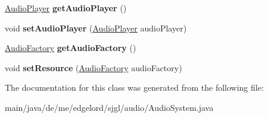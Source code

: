 \begin{DoxyCompactItemize}
\mbox{\hyperlink{classde_1_1me_1_1edgelord_1_1sjgl_1_1audio_1_1_audio_player}{Audio\+Player}} {\bfseries get\+Audio\+Player} ()
\item 
\mbox{\label{classde_1_1me_1_1edgelord_1_1sjgl_1_1audio_1_1_audio_system_ae5cf5555a1535641dbf2f3b8d6ab2d2e}} 
void {\bfseries set\+Audio\+Player} (\mbox{\hyperlink{classde_1_1me_1_1edgelord_1_1sjgl_1_1audio_1_1_audio_player}{Audio\+Player}} audio\+Player)
\item 
\mbox{\label{classde_1_1me_1_1edgelord_1_1sjgl_1_1audio_1_1_audio_system_a732e515c31f6e987cb46ebbd5a029126}} 
\mbox{\hyperlink{classde_1_1me_1_1edgelord_1_1sjgl_1_1factory_1_1_audio_factory}{Audio\+Factory}} {\bfseries get\+Audio\+Factory} ()
\item 
\mbox{\label{classde_1_1me_1_1edgelord_1_1sjgl_1_1audio_1_1_audio_system_aeb5a4e6f6beb91c1a08442f22ce814b0}} 
void {\bfseries set\+Resource} (\mbox{\hyperlink{classde_1_1me_1_1edgelord_1_1sjgl_1_1factory_1_1_audio_factory}{Audio\+Factory}} audio\+Factory)
\end{DoxyCompactItemize}


The documentation for this class was generated from the following file\+:\begin{DoxyCompactItemize}
\item 
main/java/de/me/edgelord/sjgl/audio/Audio\+System.\+java\end{DoxyCompactItemize}
